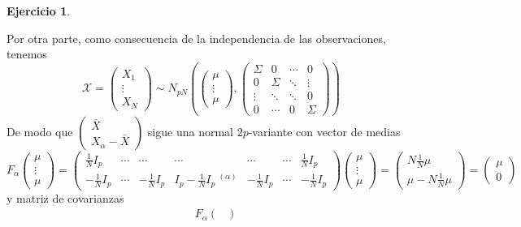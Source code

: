 \documentclass[12pt,spanish]{article}
\theoremstyle{definition}
\newtheorem{exercise}{Ejercicio}
\begin{document}
\begin{exercise}
\begin{enumerate}[$a)$]
    Por otra parte, como consecuencia de la independencia de las observaciones, tenemos
    \[\mathcal{X}=
    \begin{pmatrix}
      X_1 \\ \vdots \\ X_N
    \end{pmatrix}\sim N_{pN}\left(
      \begin{pmatrix}
        \mu \\ \vdots \\ \mu
      \end{pmatrix},
      \begin{pmatrix}
        \Sigma & 0 & \cdots & 0 \\
        0 & \Sigma & \ddots & \vdots \\
        \vdots & \ddots & \ddots & 0\\
        0 & \cdots & 0 & \Sigma
      \end{pmatrix}\right)\]
  De modo que $\begin{pmatrix}
      \bar{X} \\ X_\alpha-\bar{X}
    \end{pmatrix}$ sigue una normal $2p$-variante con vector de medias
    \[F_\alpha\begin{pmatrix}
        \mu \\ \vdots \\ \mu
      \end{pmatrix} = \begin{pmatrix}
        \frac{1}{N}I_p & \cdots & \cdots & \cdots & \cdots & \cdots & \frac{1}{N}I_p \\
        -\frac{1}{N}I_p & \cdots & -\frac{1}{N}I_p & I_p-\frac{1}{N}I_p~^{(\alpha)}& -\frac{1}{N}I_p & \cdots & -\frac{1}{N}I_p
      \end{pmatrix}\begin{pmatrix}
        \mu \\ \vdots \\ \mu
      \end{pmatrix}=
      \begin{pmatrix}
        N\frac{1}{N}\mu \\ \mu - N\frac{1}{N}\mu
      \end{pmatrix}=
      \begin{pmatrix}
        \mu \\ 0
      \end{pmatrix}
    \]
    y matriz de covarianzas
    \begin{align*}
      &F_\alpha\begin{pmatrix}

\end{pmatrix}
\end{align*}
\end{enumerate}
\end{exercise}
\end{document}
